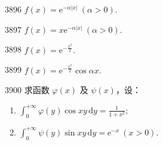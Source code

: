 
\begin{prob}[S]{3896}
$f(x) = \mathrm{e}^{-\alpha |x|}\ (\alpha > 0).$
\end{prob}

\begin{prob}[S]{3897}
$f(x) = x\mathrm{e}^{-\alpha |x|}\ (\alpha > 0).$
\end{prob}

\begin{prob}[S]{3898}
$f(x) = \mathrm{e}^{-\frac{x^2}{2}}.$
\end{prob}

\begin{prob}[S]{3899}
$f(x) = \mathrm{e}^{-\frac{x^2}{2}} \cos \alpha x.$
\end{prob}

\begin{prob}[M]{3900}
求函数 $\varphi(x)$ 及 $\psi(x)$，设：
\begin{enumerate}[label=(\alph*), itemsep=2pt, topsep=3pt]
\item $\displaystyle \int_{0}^{+\infty} \varphi(y)\cos xy\,\mathrm{d}y = \frac{1}{1 + x^2};$
\item $\displaystyle \int_{0}^{+\infty} \psi(y)\sin xy\,\mathrm{d}y = \mathrm{e}^{-x}\ (x > 0).$
\end{enumerate}
\end{prob}
